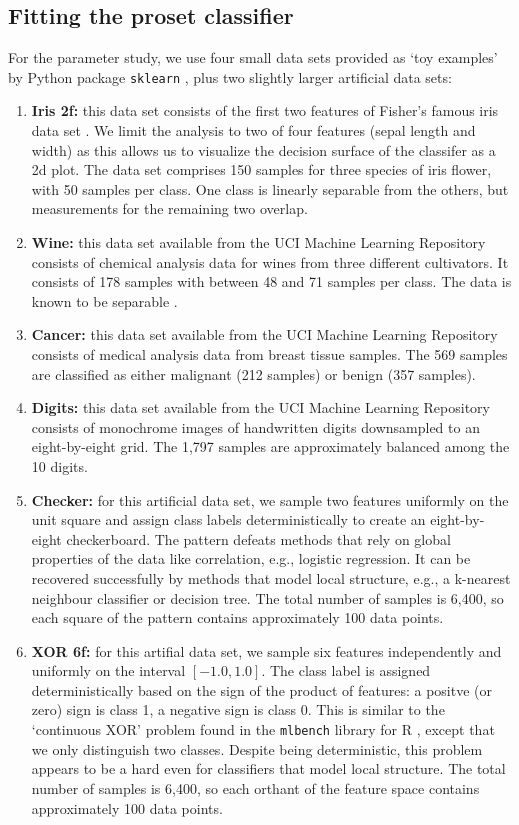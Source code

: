 \subsection{Fitting the proset classifier}
\label{sec_fit_classifier}
%
For the parameter study, we use four small data sets provided as `toy examples' by Python package \texttt{sklearn} \cite{Pedregosa_11}, plus two slightly larger artificial data sets:
%
\begin{enumerate}
\item\textbf{Iris 2f:} this data set consists of the first two features of Fisher's famous iris data set \cite{Fisher_36}.
We limit the analysis to two of four features (sepal length and width) as this allows us to visualize the decision surface of the classifer as a 2d plot.
The data set comprises 150 samples for three species of iris flower, with 50 samples per class.
One class is linearly separable from the others, but measurements for the remaining two overlap.
%
\item\textbf{Wine:} this data set available from the  UCI Machine Learning Repository \cite{Dua_19} consists of chemical analysis data for wines from three different cultivators.
It consists of 178 samples with between 48 and 71 samples per class.
The data is known to be separable \cite{Aeberhard_92}.
%
\item\textbf{Cancer:} this data set available from the UCI Machine Learning Repository \cite{Dua_19} consists of medical analysis data from breast tissue samples.
The 569 samples are classified as either malignant (212 samples) or benign (357 samples).
%
\item\textbf{Digits:} this data set available from the UCI Machine Learning Repository \cite{Dua_19} consists of monochrome images of handwritten digits downsampled to an eight-by-eight grid.
The 1,797 samples are approximately balanced among the 10 digits.
%
\item\textbf{Checker:} for this artificial data set, we sample two features uniformly on the unit square and assign class labels deterministically to create an eight-by-eight checkerboard.
The pattern defeats methods that rely on global properties of the data like correlation, e.g., logistic regression.
It can be recovered successfully by methods that model local structure, e.g., a k-nearest neighbour classifier or decision tree.
The total number of samples is 6,400, so each square of the pattern contains approximately 100 data points.
%
\item\textbf{XOR 6f:} for this artifial data set, we sample six features independently and uniformly on the interval $[-1.0, 1.0]$.
The class label is assigned deterministically based on the sign of the product of features: a positve (or zero) sign is class 1, a negative sign is class 0.
This is similar to the `continuous XOR' problem found in the \texttt{mlbench} library for R \cite{Leisch_21}, except that we only distinguish two classes.
Despite being deterministic, this problem appears to be a hard even for classifiers that model local structure.
The total number of samples is 6,400, so each orthant of the feature space contains approximately 100 data points.
\end{enumerate}
